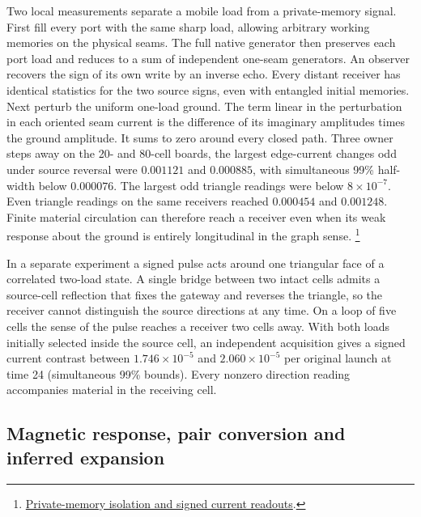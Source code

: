 \documentclass[11pt]{article}
\theoremstyle{definition}
\theoremstyle{remark}
\theoremstyle{plain}
\begin{document}
Two local measurements separate a mobile load from a private-memory
signal. First fill every port with the same sharp load, allowing
arbitrary working memories on the physical seams. The full native
generator then preserves each port load and reduces to a sum of
independent one-seam generators. An observer recovers the sign of its
own write by an inverse echo. Every distant receiver has identical
statistics for the two source signs, even with entangled initial
memories. Next perturb the uniform one-load ground. The term linear in
the perturbation in each oriented seam current is the difference of its
imaginary amplitudes times the ground amplitude. It sums to zero around
every closed path. Three owner steps away on the 20- and 80-cell
boards, the largest edge-current changes odd under source reversal were
$0.001121$ and $0.000885$, with simultaneous 99\% half-width below
$0.000076$. The largest odd triangle readings were below
$8\times10^{-7}$. Even triangle readings on the same receivers reached
$0.000454$ and $0.001248$. Finite material circulation can therefore
reach a receiver even when its weak response about the ground is
entirely longitudinal in the graph sense.%
\footnote{\href{https://github.com/FloatingPragma/observer-patch-holography/tree/main/model/candidate_laws/interval_echo/openwave/row_29_maxwell/linear_response}{Private-memory isolation and signed current readouts}.}

In a separate experiment a signed pulse acts around one triangular face
of a correlated two-load state. A single bridge between two intact
cells admits a source-cell reflection that fixes the gateway and reverses
the triangle, so the receiver cannot distinguish the source directions
at any time. On a loop of five cells the sense of the pulse reaches a
receiver two cells away. With both loads initially selected inside the
source cell, an independent acquisition gives a signed current contrast
between $1.746\times10^{-5}$ and $2.060\times10^{-5}$ per original
launch at time 24 (simultaneous 99\% bounds). Every nonzero direction
reading accompanies material in the receiving cell.

\subsection{Magnetic response, pair conversion and inferred expansion}
\end{document}
